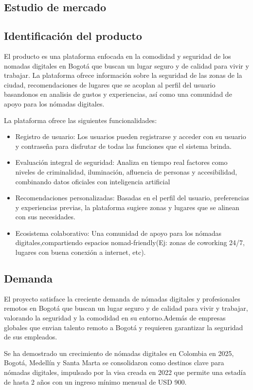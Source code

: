 \subsection{Estudio de mercado}
\subsection*{Identificación del producto}
El producto es una plataforma enfocada en la comodidad y seguridad de los nomadas digitales en Bogotá que buscan un lugar seguro y de calidad para vivir y trabajar. La plataforma ofrece información sobre la seguridad de las zonas de la ciudad, recomendaciones de lugares que se acoplan al perfil del usuario basandonos en analisis de gustos y experiencias, así como una comunidad de apoyo para los nómadas digitales.

La plataforma ofrece las siguientes funcionalidades:
\begin{itemize}
    \item Registro de usuario: Los usuarios pueden registrarse y acceder con su usuario y contraseña para disfrutar de todas las funciones que el sistema brinda.
    \item Evaluación integral de seguridad: Analiza en tiempo real factores como niveles de criminalidad, iluminación, afluencia de personas y accesibilidad, combinando datos oficiales con inteligencia artificial
    \item Recomendaciones personalizadas: Basadas en el perfil del usuario, preferencias y experiencias previas, la plataforma sugiere zonas y lugares que se alinean con sus necesidades.
    \item Ecosistema colaborativo: Una comunidad de apoyo para los nómadas digitales,compartiendo espacios nomad-friendly(Ej: zonas de coworking 24/7, lugares con buena conexión a internet, etc).
\end{itemize}

\subsection*{Demanda}
El proyecto satisface la creciente demanda de nómadas digitales y profesionales remotos en Bogotá que buscan un lugar seguro y de calidad para vivir y trabajar, valorando la seguridad y la comodidad en su entorno.Además de empresas globales que envian talento remoto a Bogotá y requieren garantizar la seguridad de sus empleados.

Se ha demostrado un crecimiento de nómadas digitales en Colombia en 2025, Bogotá, Medellín y Santa Marta se consolidaron como destinos clave para nómadas digitales, impulsado por la visa creada en 2022 que permite una estadía de hasta 2 años con un ingreso mínimo mensual de USD 900.\cite{crecimiento_nomadas_digitales}

